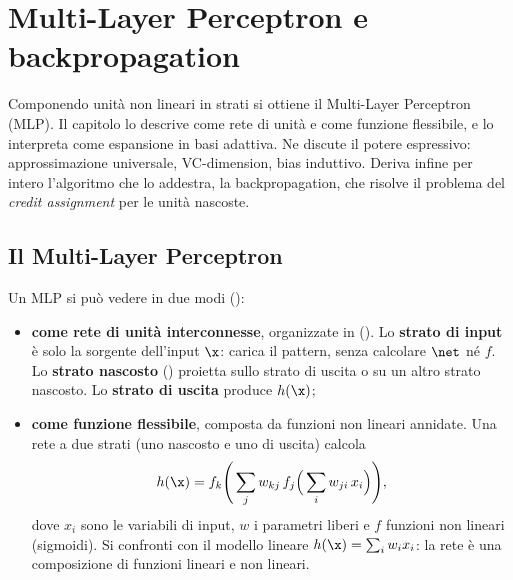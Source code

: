 \chapter{Multi-Layer Perceptron e backpropagation}
\label{cap:mlp}

\begin{inbreve}
Componendo unità non lineari in strati si ottiene il Multi-Layer Perceptron (MLP). Il capitolo lo descrive come
rete di unità e come funzione flessibile, e lo interpreta come espansione in basi adattiva. Ne discute il potere
espressivo: approssimazione universale, VC-dimension, bias induttivo. Deriva infine per intero l'algoritmo che lo
addestra, la backpropagation, che risolve il problema del \emph{credit assignment} per le unità nascoste.
\end{inbreve}

\section{Il Multi-Layer Perceptron}

Un MLP si può vedere in due modi ():
\begin{itemize}
  \item \textbf{come rete di unità interconnesse}, organizzate in  (). Lo
        \textbf{strato di input} è solo la sorgente dell'input $\x$: carica il pattern, senza calcolare $\net$ né
        $f$. Lo \textbf{strato nascosto} () proietta sullo strato di uscita o su un altro strato
        nascosto. Lo \textbf{strato di uscita} produce $h(\x)$;
  \item \textbf{come funzione flessibile}, composta da funzioni non lineari annidate. Una rete a due strati (uno
        nascosto e uno di uscita) calcola
        \begin{equation}\label{eq:mlp}
        h(\x) = f_k\Bigg(\sum_j w_{kj}\,f_j\Big(\sum_i w_{ji}\,x_i\Big)\Bigg),
        \end{equation}
        dove $x_i$ sono le variabili di input, $w$ i parametri liberi e $f$ funzioni non lineari (sigmoidi). Si
        confronti con il modello lineare $h(\x)=\sum_iw_ix_i$: la rete è una composizione di funzioni lineari e
        non lineari.
\end{itemize}

